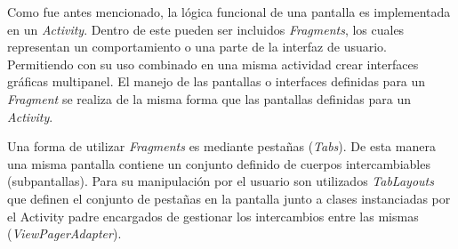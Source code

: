     \par Como fue antes mencionado, la lógica funcional de una pantalla es implementada en un \textit{Activity}. Dentro de este pueden ser incluidos \textit{Fragments}, los cuales representan un comportamiento o una parte de la interfaz de usuario. Permitiendo con su uso combinado en una misma actividad crear interfaces gráficas multipanel. El manejo de las pantallas o interfaces definidas para un \textit{Fragment} se realiza de la misma forma que las pantallas definidas para un \textit{Activity}.
    
    \par Una forma de utilizar \textit{Fragments} es mediante pestañas (\textit{Tabs}). De esta manera una misma pantalla contiene un conjunto definido de cuerpos intercambiables (subpantallas). Para su manipulación por el usuario son utilizados \textit{TabLayouts} que definen el conjunto de pestañas en la pantalla junto a clases instanciadas por el Activity padre encargados de gestionar los intercambios entre las mismas (\textit{ViewPagerAdapter}). 
    
    
    
